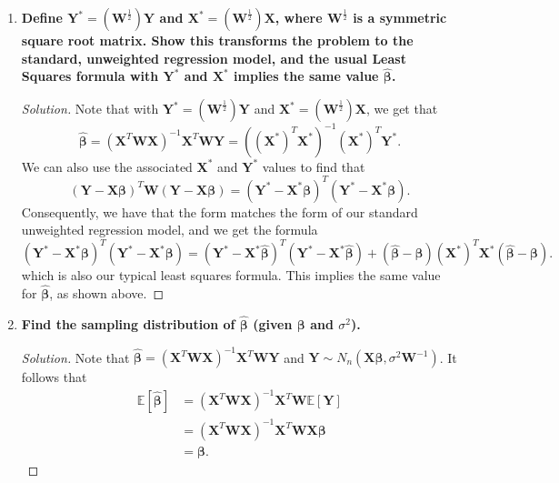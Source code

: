 \documentclass[11pt]{article}
\newenvironment{solution}
  {\renewcommand\qedsymbol{$\blacksquare$}\begin{proof}[Solution]}
  {\end{proof}}
\begin{document}
\begin{enumerate}
\begin{enumerate}
	  \item \textbf{Define $\bm{Y}^* = (\bm{W}^{\frac{1}{2}})\bm{Y}$ and $\bm{X}^* = (\bm{W}^{\frac{1}{2}})\bm{X}$, where $\bm{W}^{\frac{1}{2}}$ is a symmetric square root matrix.
      Show this transforms the problem to the standard, unweighted regression model, and the usual Least Squares formula with $\bm{Y}^*$ and $\bm{X}^*$ implies the same value $\hat{\bm{\beta}}$.}

	  \begin{solution}
	Note that with  $\bm{Y}^* = (\bm{W}^{\frac{1}{2}})\bm{Y}$ and $\bm{X}^* = (\bm{W}^{\frac{1}{2}})\bm{X}$, we get that
	  \[
		\hat{\bm{\beta}} = (\bm{X}^T \bm{WX})^{-1} \bm{X}^T \bm{WY} = ((\bm{X}^*)^T\bm{X}^*)^{-1} (\bm{X}^*)^T \bm{Y}^*.
	  \]
	  We can also use the associated $\bm{X}^*$ and $\bm{Y}^*$ values to find that 
	  \[
		(\bm{Y} - \bm{X\beta})^T\bm{W}(\bm{Y} - \bm{X\beta}) = (\bm{Y}^* - \bm{X^*\beta})^T(\bm{Y}^* - \bm{X^*\beta}).
	  \]
	  Consequently, we have that the form matches the form of our standard unweighted regression model, and we get the formula
	  \[
		(\bm{Y}^* - \bm{X^*\beta})^T(\bm{Y}^* - \bm{X^*\beta}) = (\bm{Y}^* - \bm{X}^*\hat{\bm{\beta}})^T(\bm{Y}^* - \bm{X^*\hat{\bm{\beta}}}) + (\hat{\bm{\beta}} - \bm{\beta})(\bm{X}^*)^T\bm{X}^*(\hat{\bm{\beta}} - \bm{\beta}).
	  \]
	  which is also our typical least squares formula. This implies the same value for $\hat{\bm{\beta}}$, as shown above. 
	  \end{solution}
	  
      \item \textbf{Find the sampling distribution of $\hat{\bm{\beta}}$ (given $\bm{\beta}$ and $\sigma^2$).}
	  \begin{solution}
		Note that $\hat{\bm{\beta}} = (\bm{X}^T \bm{WX})^{-1} \bm{X}^T \bm{WY}$ and  $\bm{Y} \sim N_n(\bm{X\beta}, \sigma^2\bm{W}^{-1})$. It follows that
		\begin{align*}
			\mathbb{E}\left[\hat{\bm{\beta}} \right] &= (\bm{X}^T \bm{WX})^{-1} \bm{X}^T \bm{W}  \mathbb{E}\left[\bm{Y} \right] \\
			&= (\bm{X}^T \bm{WX})^{-1} \bm{X}^T \bm{W} \bm{X\beta} \\
			&= \bm{\beta}.
		\end{align*}


\end{solution}
\end{enumerate}
\end{enumerate}
\end{document}
